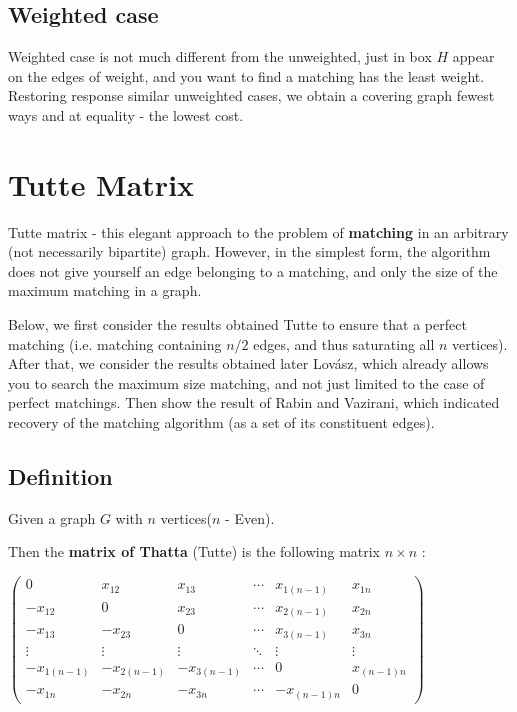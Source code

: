 \subsection{ Weighted case }

Weighted case is not much different from the unweighted, just in box $H$ appear on the edges of weight, and you want to find a matching has the least weight. Restoring response similar unweighted cases, we obtain a covering graph fewest ways and at equality - the lowest cost.

\section{ Tutte Matrix }
Tutte matrix - this elegant approach to the problem of \textbf{matching} in an arbitrary (not necessarily bipartite) graph. However, in the simplest form, the algorithm does not give yourself an edge belonging to a matching, and only the size of the maximum matching in a graph.

Below, we first consider the results obtained Tutte to ensure that a perfect matching (i.e. matching containing $n / 2$ edges, and thus saturating all $n$ vertices). After that, we consider the results obtained later Lovász, which already allows you to search the maximum size matching, and not just limited to the case of perfect matchings. Then show the result of Rabin and Vazirani, which indicated recovery of the matching algorithm (as a set of its constituent edges).

\subsection{ Definition }

Given a graph $G$ with $n$ vertices($n$ - Even).

Then the \textbf{matrix of Thatta} (Tutte) is the following matrix $n \times n$ :

$\begin{pmatrix}0 & x_{12} & x_{13} & \cdots & x_{1(n-1)} & x_{1n}\\
-x_{12} & 0 & x_{23} & \cdots & x_{2(n-1)} & x_{2n}\\
-x_{13} & -x_{23} & 0 & \cdots & x_{3(n-1)} & x_{3n}\\
\vdots & \vdots & \vdots & \ddots & \vdots & \vdots\\
-x_{1(n-1)} & -x_{2(n-1)} & -x_{3(n-1)} & \cdots & 0 & x_{(n-1)n}\\
-x_{1n} & -x_{2n} & -x_{3n} & \cdots & -x_{(n-1)n} & 0
\end{pmatrix}
 $

